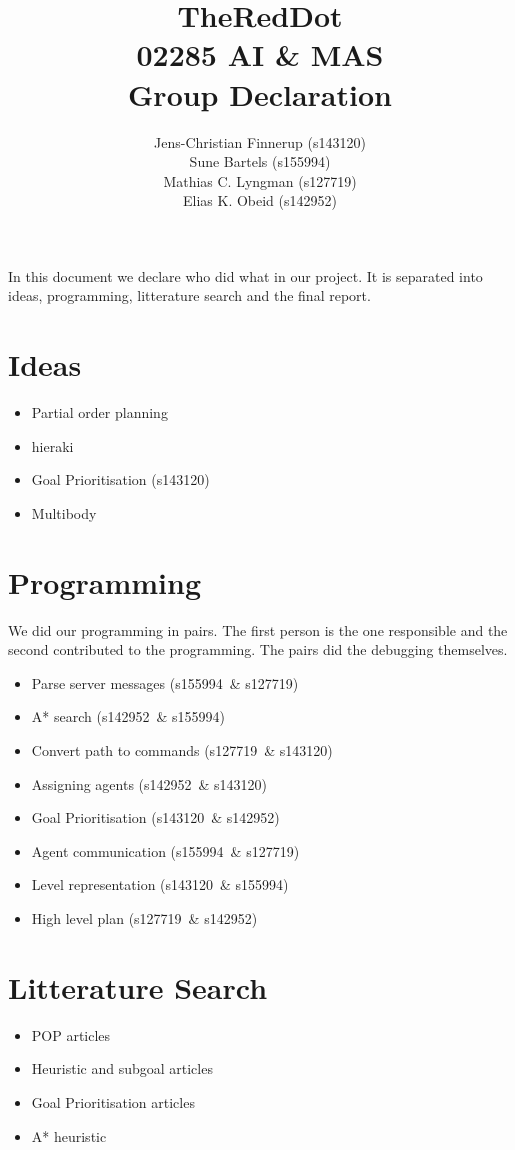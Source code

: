\documentclass[a4paper]{article}
\title{TheRedDot\\02285 AI \& MAS\\Group Declaration}
\author{
Jens-Christian Finnerup (s143120)\\
Sune Bartels  (s155994)\\
Mathias C. Lyngman (s127719)\\
Elias K. Obeid (s142952)}
\newcommand{\jens}{s143120}
\newcommand{\sune}{s155994}
\newcommand{\superdude}{s127719}
\newcommand{\elias}{s142952}
\begin{document}
\maketitle

In this document we declare who did what in our project. It is separated into
ideas, programming, litterature search and the final report.\\

\section{Ideas}
\begin{itemize}
  \item Partial order planning
  \item hieraki
  \item Goal Prioritisation (\jens)
  \item Multibody
\end{itemize}

\section{Programming}
We did our programming in pairs. The first person is the one responsible and the second contributed to the programming. The pairs did the debugging themselves.
\begin{itemize}
  \item Parse server messages (\sune\ \& \superdude)
  \item A* search (\elias\ \& \sune)
  \item Convert path to commands (\superdude\ \& \jens)
  \item Assigning agents (\elias\ \& \jens)
  \item Goal Prioritisation (\jens\ \& \elias)
  \item Agent communication (\sune\ \& \superdude)
  \item Level representation (\jens\ \& \sune)
  \item High level plan (\superdude\ \& \elias)
\end{itemize}

\section{Litterature Search}
\begin{itemize}
  \item POP articles
  \item Heuristic and subgoal articles
  \item Goal Prioritisation articles
  \item A* heuristic
\end{itemize}
\end{document}
